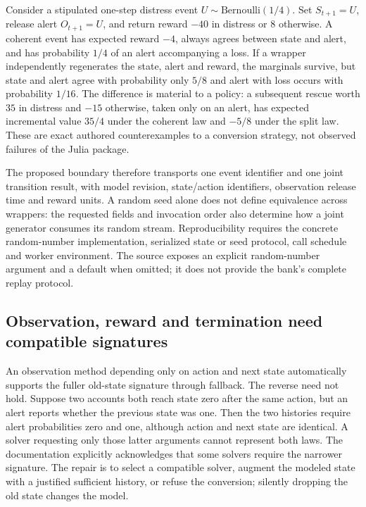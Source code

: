 Consider a stipulated one-step distress event $U\sim\mathrm{Bernoulli}(1/4)$.
Set $S_{t+1}=U$, release alert $O_{t+1}=U$, and return reward $-40$ in distress
or $8$ otherwise. A coherent event has expected reward $-4$, always agrees
between state and alert, and has probability $1/4$ of an alert accompanying a
loss. If a wrapper independently regenerates the state, alert and reward,
the marginals survive, but state and alert agree with probability only $5/8$
and alert with loss occurs with probability $1/16$. The difference is material
to a policy: a subsequent rescue worth $35$ in distress and $-15$ otherwise,
taken only on an alert, has expected incremental value $35/4$ under the coherent
law and $-5/8$ under the split law. These are exact authored counterexamples
to a conversion strategy, not observed failures of the Julia package.
\citep{exec23_pomdpsjl_reference}

The proposed boundary therefore transports one event identifier and one
joint transition result, with model revision, state/action identifiers,
observation release time and reward units. A random seed alone does not define
equivalence across wrappers: the requested fields and invocation order also
determine how a joint generator consumes its random stream. Reproducibility
requires the concrete random-number implementation, serialized state or seed
protocol, call schedule and worker environment. The source exposes an explicit
random-number argument and a default when omitted; it does not provide the
bank's complete replay protocol.
\citep{exec23_pomdpsjl_sources}

\subsection{Observation, reward and termination need compatible signatures}
\label{exec23:pomdpsjl-contracts}

An observation method depending only on action and next state automatically
supports the fuller old-state signature through fallback. The reverse need
not hold. Suppose two accounts both reach state zero after the same action,
but an alert reports whether the previous state was one. Then the two histories
require alert probabilities zero and one, although action and next state are
identical. A solver requesting only those latter arguments cannot represent
both laws. The documentation explicitly acknowledges that some solvers require
the narrower signature. The repair is to select a compatible solver, augment
the modeled state with a justified sufficient history, or refuse the conversion;
silently dropping the old state changes the model.
\citep{exec23_pomdpsjl_sources,exec23_pomdpsjl_reference}

